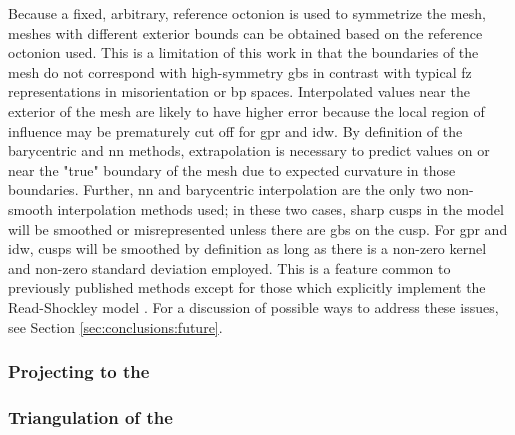 \documentclass[preprint,12pt]{elsarticle}
\begin{document}
Because a fixed, arbitrary, reference octonion is used to symmetrize the mesh, meshes with different exterior bounds can be obtained based on the reference octonion used. This is a limitation of this work in that the boundaries of the mesh do not correspond with high-symmetry \glspl{gb} in contrast with typical \gls{fz} representations in misorientation or \gls{bp} \cite{patalaSymmetriesRepresentationGrain2013,homerGrainBoundaryPlane2015} spaces. Interpolated values near the exterior of the mesh are likely to have higher error because the local region of influence may be prematurely cut off for \gls{gpr} and \gls{idw}. By definition of the barycentric and \gls{nn} methods, extrapolation is necessary to predict values on or near the "true" boundary of the mesh due to expected curvature in those boundaries. Further, \gls{nn} and barycentric interpolation are the only two non-smooth interpolation methods used; in these two cases, sharp cusps in the model will be smoothed or misrepresented unless there are \glspl{gb} on the cusp. For \gls{gpr} and \gls{idw}, cusps will be smoothed by definition as long as there is a non-zero kernel and non-zero standard deviation employed. This is a feature common to previously published methods \cite{liRelativeGrainBoundary2009,shenDeterminingGrainBoundary2019,chesserLearningGrainBoundary2020} except for those \cite{bulatovGrainBoundaryEnergy2014,shekhawatGeneralizedReadShockley2016} which explicitly implement the Read-Shockley model \cite{readDislocationModelsCrystal1950}. For a discussion of possible ways to address these issues, see Section \cref{sec:conclusions:future}.


\subsubsection{Projecting  to the }
\label{sec:methods:projecting}


\subsubsection{Triangulation of the }
\label{sec:methods:triangulation}

\end{document}
